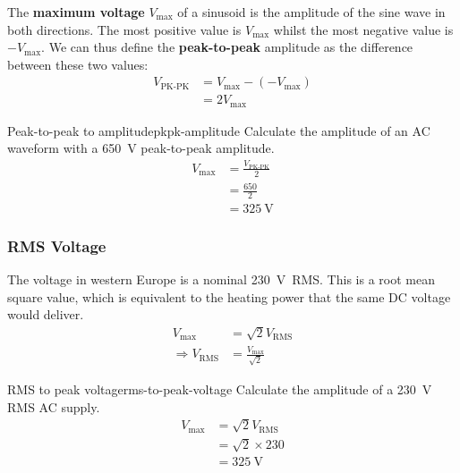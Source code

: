 \documentclass{pgnotes}
\begin{document}

The \textbf{maximum voltage} $V_{\mbox{max}}$ of a sinusoid is the amplitude of the sine wave in both directions.
The most positive value is $V_{\mbox{max}}$ whilst the most negative value is $-V_{\mbox{max}}$.
We can thus define the \textbf{peak-to-peak} amplitude as the difference between these two values:
\begin{align}
  V_{\mbox{PK-PK}} & = V_{\mbox{max}} - ( - V_{\mbox{max}} ) \\
                   & = 2 V_{\mbox{max}}                    
\end{align}

\begin{example}{Peak-to-peak to amplitude}{pkpk-amplitude}
  Calculate the amplitude of an AC waveform with a \SI{650}{\volt} peak-to-peak amplitude.
  \tcblower
  \begin{align}
    V_{\mbox{max}} & = \frac{V_{\mbox{PK-PK}}}{2} \\
                   & = \frac{650}{2} \\
                   & = \SI{325}{\volt} 
  \end{align}
\end{example}

\subsubsection{RMS Voltage}

The voltage in western Europe is a nominal \SI{230}{\volt}~RMS.
This is a root mean square value, which is equivalent to the heating power that the same DC voltage would deliver.
\begin{align}
  V_{\mbox{max}} & = \sqrt{2} V_{\mbox{RMS}} \\
  \Rightarrow V_{\mbox{RMS}} & = \frac{V_{\mbox{max}}}{\sqrt{2}}
\end{align}

\begin{example}{RMS to peak voltage}{rms-to-peak-voltage}
  Calculate the amplitude of a \SI{230}{\volt} RMS AC supply.
  \tcblower
  \begin{align}
    V_{\mbox{max}} & = \sqrt{2} V_{\mbox{RMS}} \\
                   & = \sqrt{2} \times 230 \\
                   & = \SI{325}{\volt}                    
  \end{align}
\end{example}
\end{document}

